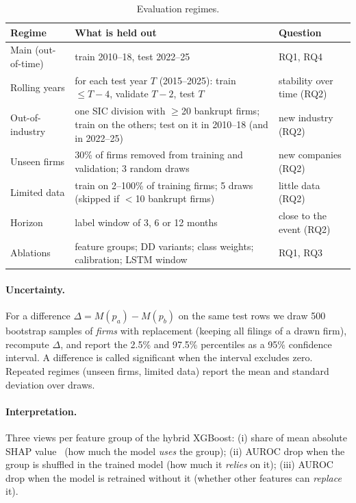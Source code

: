 \begin{table}[htbp]
\centering
\small
\begin{tabular}{p{.20\linewidth}p{.45\linewidth}p{.25\linewidth}}
\toprule
Regime & What is held out & Question \\
\midrule
Main (out-of-time) & train 2010--18, test 2022--25 & RQ1, RQ4 \\
Rolling years & for each test year $T$ (2015--2025): train $\le T-4$, validate $T-2$, test $T$ & stability over time (RQ2) \\
Out-of-industry & one SIC division with $\ge$20 bankrupt firms; train on the others; test on it in 2010--18 (and in 2022--25) & new industry (RQ2) \\
Unseen firms & 30\% of firms removed from training and validation; 3 random draws & new companies (RQ2) \\
Limited data & train on 2--100\% of training firms; 5 draws (skipped if $<$10 bankrupt firms) & little data (RQ2) \\
Horizon & label window of 3, 6 or 12 months & close to the event (RQ2) \\
Ablations & feature groups; DD variants; class weights; calibration; LSTM window & RQ1, RQ3 \\
\bottomrule
\end{tabular}
\caption{Evaluation regimes.}
\label{tab:regimes}
\end{table}

\paragraph{Uncertainty.} For a difference $\Delta = M(p_a)-M(p_b)$ on the same test rows we draw 500
bootstrap samples of \emph{firms} with replacement (keeping all filings of a drawn firm), recompute $\Delta$,
and report the 2.5\% and 97.5\% percentiles as a 95\% confidence interval. A difference is called significant
when the interval excludes zero. Repeated regimes (unseen firms, limited data) report the mean and standard
deviation over draws.

\paragraph{Interpretation.} Three views per feature group of the hybrid XGBoost: (i) share of mean absolute
SHAP value~\cite{lundberg2017shap} (how much the model \emph{uses} the group); (ii) AUROC drop when the group
is shuffled in the trained model (how much it \emph{relies} on it); (iii) AUROC drop when the model is
retrained without it (whether other features can \emph{replace} it).

